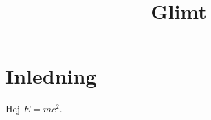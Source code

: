 \documentclass{article}
\title{Glimt}
\begin{document}
\maketitle
\section{Inledning}
Hej $E = mc^2$.
\end{document}
